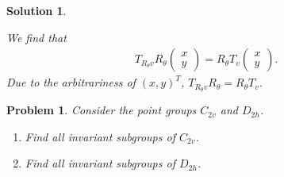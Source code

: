 \documentclass[UTF8,10pt,a4paper]{article}
\theoremstyle{Problem}
\newtheorem{prob}{Problem}
\theoremstyle{Solution}
\newtheorem*{sol}{Solution}
\begin{document}
\begin{sol}
\begin{enumerate}
        We find that
        \begin{align}
            T_{R_{\theta}v}R_{\theta}\left(\begin{matrix}
                x\\
                y
            \end{matrix}\right)=R_{\theta}T_v\left(\begin{matrix}
                x\\
                y
            \end{matrix}\right).
        \end{align}
        Due to the arbitrariness of $(x,y)^T$, $T_{R_{\theta}v}R_{\theta}=R_{\theta}T_v$.
    \end{enumerate}
\end{sol}

\begin{prob}
    Consider the point groups $C_{2v}$ and $D_{2h}$.
    \begin{enumerate}
        \item[(a)] Find all invariant subgroups of $C_{2v}$.
        \item[(b)] Find all invariant subgroups of $D_{2h}$.
    \end{enumerate}
\end{prob}
\end{document}
